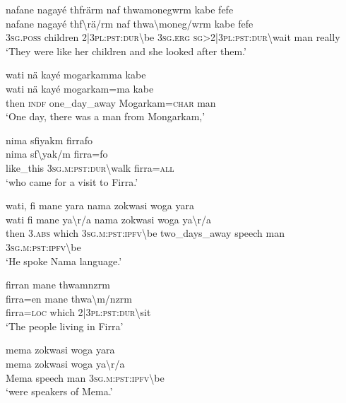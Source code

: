 \ea\label{ex:7:a4709}
nafane nagayé thfrärm naf thwamonegwrm kabe fefe\\
\gll nafane	nagayé	thf{\textbackslash}rä/rm	naf	thwa{\textbackslash}moneg/wrm	kabe	fefe\\
     3\textsc{sg}.\textsc{poss}	children	2|3\textsc{pl}:\textsc{pst}:\textsc{dur}{\textbackslash}be	3\textsc{sg}.\textsc{erg}	\textsc{sg}>2|3\textsc{pl}:\textsc{pst}:\textsc{dur}{\textbackslash}wait	man	really\\
\glt `They were like her children and she looked after them.'
\z

\ea\label{ex:7:a4711}
wati nä kayé mogarkamma kabe\\
\gll wati	nä	kayé	mogarkam=ma	kabe\\
     then	\textsc{indf}	one\_day\_away	Mogarkam=\textsc{char}	man\\
\glt `One day, there was a man from Mongarkam,'
\z

\ea\label{ex:7:a4713}
nima sfiyakm firrafo\\
\gll nima	sf{\textbackslash}yak/m	firra=fo\\
     like\_this	3\textsc{sg}.\textsc{m}:\textsc{pst}:\textsc{dur}{\textbackslash}walk	firra=\textsc{all}\\
\glt `who came for a visit to Firra.'
\z

\ea\label{ex:7:a4714}
wati, fi mane yara nama zokwasi woga yara\\
\gll wati	fi	mane	ya{\textbackslash}r/a	nama	zokwasi	woga	ya{\textbackslash}r/a\\
     then	3.\textsc{abs}	which	3\textsc{sg}.\textsc{m}:\textsc{pst}:\textsc{ipfv}{\textbackslash}be	two\_days\_away	speech	man	3\textsc{sg}.\textsc{m}:\textsc{pst}:\textsc{ipfv}{\textbackslash}be\\
\glt `He spoke Nama language.'
\z

\ea\label{ex:7:a4715}
firran mane thwamnzrm\\
\gll firra=en	mane	thwa{\textbackslash}m/nzrm\\
     firra=\textsc{loc}	which	2|3\textsc{pl}:\textsc{pst}:\textsc{dur}{\textbackslash}sit\\
\glt `The people living in Firra'
\z

\ea\label{ex:7:a4716}
mema zokwasi woga yara\\
\gll mema	zokwasi	woga	ya{\textbackslash}r/a\\
     Mema	speech	man	3\textsc{sg}.\textsc{m}:\textsc{pst}:\textsc{ipfv}{\textbackslash}be\\
\glt `were speakers of Mema.'
\z

